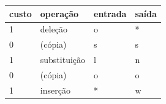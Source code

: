 \documentclass[compress]{beamer}
\begin{document}
\begin{frame}[shrink=10]
\vfill

\bigskip

\begin{tabular}{ll||l|l}
custo & operação & entrada & saída\\\hline\hline
1 & deleção  &o&*\\\hline
0 & (cópia)  &s&s\\\hline
1 & substituição &l&n\\\hline
0 & (cópia)  &o&o\\\hline
1 & inserção  &*&w\\\hline

\end{tabular}
\end{frame}






\begin{frame}[shrink=15]

\bigskip


\end{frame}
\end{document}
